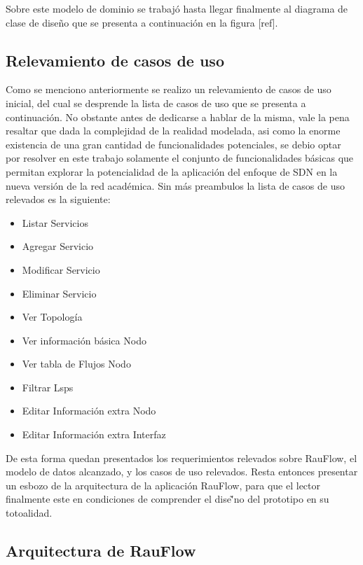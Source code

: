 Sobre este modelo de dominio se trabaj\'o hasta llegar finalmente al diagrama de clase de dise\~no que se presenta a continuaci\'on en la figura [ref].

\newpage
\subsection[Relevamiento de casos de uso]{Relevamiento de casos de uso}

Como se menciono anteriormente se realizo un relevamiento de casos de uso inicial, del cual se desprende la lista de casos de uso que se presenta a continuaci\'on. No obstante antes de dedicarse a hablar de la misma, vale la pena resaltar que dada la complejidad de la realidad modelada, asi como la enorme existencia de una gran cantidad de funcionalidades potenciales, se debio optar por resolver en este trabajo solamente el conjunto de funcionalidades b\'asicas que permitan explorar la potencialidad de la aplicaci\'on del enfoque de SDN en la nueva versi\'on de la red acad\'emica. Sin m\'as preambulos la lista de casos de uso relevados es la siguiente:

\begin{itemize}
\item Listar Servicios
\item Agregar Servicio
\item Modificar Servicio
\item Eliminar Servicio
\item Ver Topolog\'ia
\item Ver informaci\'on b\'asica Nodo
\item Ver tabla de Flujos Nodo
\item Filtrar Lsps
\item Editar Informaci\'on extra Nodo
\item Editar Informaci\'on extra Interfaz
\end{itemize}

De esta forma quedan presentados los requerimientos relevados sobre RauFlow, el modelo de datos alcanzado, y los casos de uso relevados. Resta entonces presentar un esbozo de la arquitectura de la aplicaci\'on RauFlow, para que el lector finalmente este en condiciones de comprender el dise\~'no del prototipo en su totoalidad.

\newpage
\subsection[Arquitectura de RauFlow]{Arquitectura de RauFlow}

